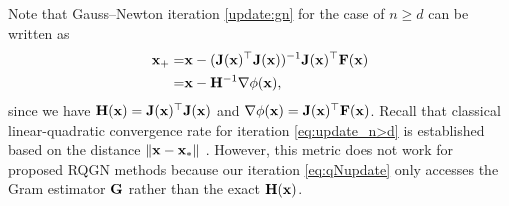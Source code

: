 \documentclass[11pt]{article}
\theoremstyle{plain}
\theoremstyle{definition}
\theoremstyle{remark}
\theoremstyle{plain}
\def\vx{{\bf{x}}}
\def\mF {{\bf F}}
\def\mG {{\bf G}}
\def\mH {{\bf H}}
\def\vx {{{\bf x}}}
\def\F{{\bf F}}
\def \J{{\bf J}}
\def\x{{\bf x}}
\begin{document}
Note that Gauss--Newton iteration \eqref{update:gn} for the case of $n\geq d$ can be written as
\begin{align}\label{eq:update_n>d}
\begin{split}    
    \vx_+= &\x-(\J(\x)^{\top}\J(\x))^{-1}\J(\x)^{\top}\mF(\vx)  \\
    = & \x- \mH^{-1}\nabla \phi(\x),
\end{split}
\end{align}
since we have $\mH(\vx)=\J(\x)^{\top}\J(\x)$ and $\nabla \phi(\x)=\J(\x)^{\top}\F(\x)$.
Recall that classical linear-quadratic convergence rate for iteration \eqref{eq:update_n>d} is established based on the distance $\|\x-\x_*\|$ \citep{gratton2007approximate,dennis1996numerical}.
However, this metric does not work for proposed RQGN methods because our iteration \eqref{eq:qNupdate} only accesses the Gram estimator $\mG$ rather than the exact $\mH(\vx)$.
\end{document}
